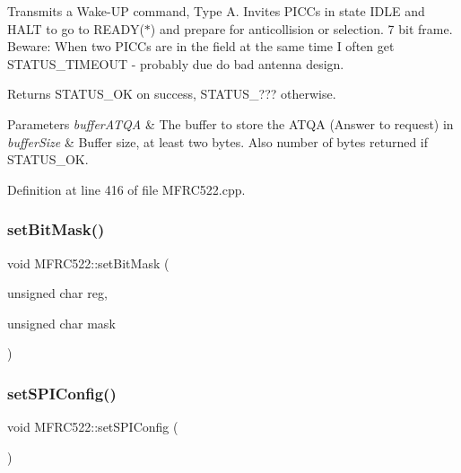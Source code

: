 Transmits a Wake-\/\+UP command, Type A. Invites P\+I\+C\+Cs in state I\+D\+LE and H\+A\+LT to go to R\+E\+A\+D\+Y($\ast$) and prepare for anticollision or selection. 7 bit frame. Beware\+: When two P\+I\+C\+Cs are in the field at the same time I often get S\+T\+A\+T\+U\+S\+\_\+\+T\+I\+M\+E\+O\+UT -\/ probably due do bad antenna design.

\begin{DoxyReturn}{Returns}
S\+T\+A\+T\+U\+S\+\_\+\+OK on success, S\+T\+A\+T\+U\+S\+\_\+??? otherwise. 
\end{DoxyReturn}

\begin{DoxyParams}{Parameters}
{\em buffer\+A\+T\+QA} & The buffer to store the A\+T\+QA (Answer to request) in \\
\hline
{\em buffer\+Size} & Buffer size, at least two bytes. Also number of bytes returned if S\+T\+A\+T\+U\+S\+\_\+\+OK. \\
\hline
\end{DoxyParams}


Definition at line 416 of file M\+F\+R\+C522.\+cpp.

\mbox{\label{class_m_f_r_c522_a5b743b53393d88588e9d878159e89faf}} 
\subsubsection{\texorpdfstring{set\+Bit\+Mask()}{setBitMask()}}
{\footnotesize\ttfamily void M\+F\+R\+C522\+::set\+Bit\+Mask (\begin{DoxyParamCaption}\item[{unsigned char}]{reg,  }\item[{unsigned char}]{mask }\end{DoxyParamCaption})}

\mbox{\label{class_m_f_r_c522_a425d73a02db79e17abd78ff805770fc3}} 
\subsubsection{\texorpdfstring{set\+S\+P\+I\+Config()}{setSPIConfig()}}
{\footnotesize\ttfamily void M\+F\+R\+C522\+::set\+S\+P\+I\+Config (\begin{DoxyParamCaption}{ }\end{DoxyParamCaption})}

